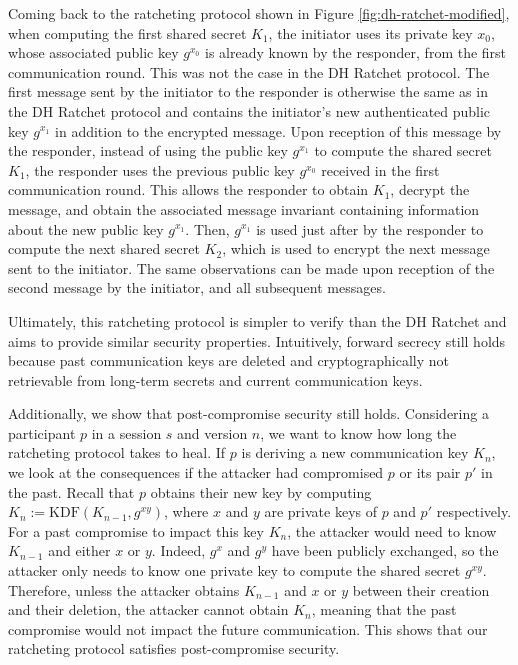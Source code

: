 Coming back to the ratcheting protocol shown in Figure \ref{fig:dh-ratchet-modified}, when computing the first shared secret $K_1$, the initiator uses its private key $x_0$, whose associated public key $g^{x_0}$ is already known by the responder, from the first communication round.
This was not the case in the DH Ratchet protocol.
The first message sent by the initiator to the responder is otherwise the same as in the DH Ratchet protocol and contains the initiator's new authenticated public key $g^{x_1}$ in addition to the encrypted message.
Upon reception of this message by the responder, instead of using the public key $g^{x_1}$ to compute the shared secret $K_1$, the responder uses the previous public key $g^{x_0}$ received in the first communication round.
This allows the responder to obtain $K_1$, decrypt the message, and obtain the associated message invariant containing information about the new public key $g^{x_1}$.
Then, $g^{x_1}$ is used just after by the responder to compute the next shared secret $K_2$, which is used to encrypt the next message sent to the initiator.
The same observations can be made upon reception of the second message by the initiator, and all subsequent messages. 

Ultimately, this ratcheting protocol is simpler to verify than the DH Ratchet and aims to provide similar security properties.
Intuitively, forward secrecy still holds because past communication keys are deleted and cryptographically not retrievable from long-term secrets and current communication keys.

Additionally, we show that post-compromise security still holds.
Considering a participant $p$ in a session $s$ and version $n$, we want to know how long the ratcheting protocol takes to heal. 
If $p$ is deriving a new communication key $K_n$, we look at the consequences if the attacker had compromised $p$ or its pair $p'$ in the past.
Recall that $p$ obtains their new key by computing $K_n := \text{KDF}(K_{n-1}, g^{xy})$, where $x$ and $y$ are private keys of $p$ and $p'$ respectively.
For a past compromise to impact this key $K_n$, the attacker would need to know $K_{n-1}$ and either $x$ or $y$. Indeed, $g^x$ and $g^y$ have been publicly exchanged, so the attacker only needs to know one private key to compute the shared secret $g^{xy}$.
Therefore, unless the attacker obtains $K_{n-1}$ and $x$ or $y$ between their creation and their deletion, the attacker cannot obtain $K_n$, meaning that the past compromise would not impact the future communication.
This shows that our ratcheting protocol satisfies post-compromise security.

